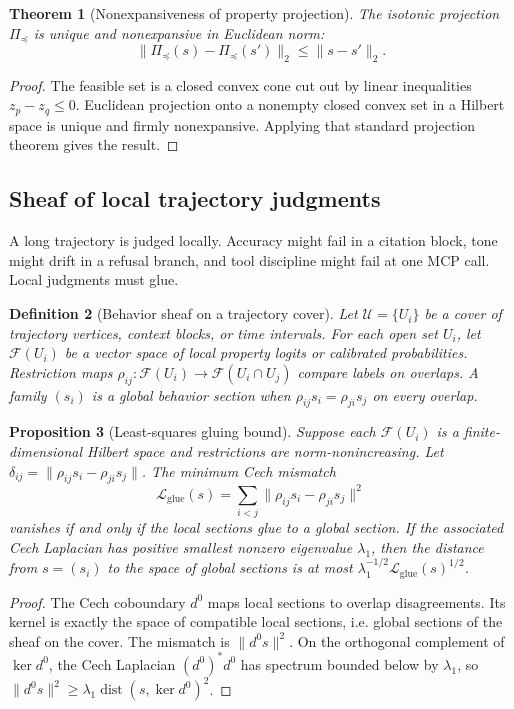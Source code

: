 \documentclass[11pt]{article}
\newtheorem{theorem}{Theorem}[section]
\newtheorem{proposition}[theorem]{Proposition}
\newtheorem{definition}[theorem]{Definition}
\newcommand{\calF}{\mathcal{F}}
\newcommand{\calU}{\mathcal{U}}
\newcommand{\dist}{\operatorname{dist}}
\newcommand{\loss}{\mathcal{L}}
\numberwithin{equation}{section}
\begin{document}
\begin{theorem}[Nonexpansiveness of property projection]
The isotonic projection $\Pi_{\preceq}$ is unique and nonexpansive in Euclidean norm:
\begin{equation}
\|\Pi_{\preceq}(s)-\Pi_{\preceq}(s')\|_2\le \|s-s'\|_2.
\end{equation}
\end{theorem}
\begin{proof}
The feasible set is a closed convex cone cut out by linear inequalities $z_p-z_q\le0$. Euclidean projection onto a nonempty closed convex set in a Hilbert space is unique and firmly nonexpansive. Applying that standard projection theorem gives the result.
\end{proof}

\subsection{Sheaf of local trajectory judgments}
A long trajectory is judged locally. Accuracy might fail in a citation block, tone might drift in a refusal branch, and tool discipline might fail at one MCP call. Local judgments must glue.

\begin{definition}[Behavior sheaf on a trajectory cover]
Let $\calU=\{U_i\}$ be a cover of trajectory vertices, context blocks, or time intervals. For each open set $U_i$, let $\calF(U_i)$ be a vector space of local property logits or calibrated probabilities. Restriction maps $\rho_{ij}:\calF(U_i)\to\calF(U_i\cap U_j)$ compare labels on overlaps. A family $(s_i)$ is a global behavior section when $\rho_{ij}s_i=\rho_{ji}s_j$ on every overlap.
\end{definition}

\begin{proposition}[Least-squares gluing bound]
Suppose each $\calF(U_i)$ is a finite-dimensional Hilbert space and restrictions are norm-nonincreasing. Let $\delta_{ij}=\|\rho_{ij}s_i-\rho_{ji}s_j\|$. The minimum Cech mismatch
\begin{equation}
\loss_{\mathrm{glue}}(s)=\sum_{i<j}\|\rho_{ij}s_i-\rho_{ji}s_j\|^2
\end{equation}
vanishes if and only if the local sections glue to a global section. If the associated Cech Laplacian has positive smallest nonzero eigenvalue $\lambda_1$, then the distance from $s=(s_i)$ to the space of global sections is at most $\lambda_1^{-1/2}\loss_{\mathrm{glue}}(s)^{1/2}$.
\end{proposition}
\begin{proof}
The Cech coboundary $d^0$ maps local sections to overlap disagreements. Its kernel is exactly the space of compatible local sections, i.e. global sections of the sheaf on the cover. The mismatch is $\|d^0s\|^2$. On the orthogonal complement of $\ker d^0$, the Cech Laplacian $(d^0)^\ast d^0$ has spectrum bounded below by $\lambda_1$, so $\|d^0s\|^2\ge \lambda_1\dist(s,\ker d^0)^2$.
\end{proof}
\end{document}
